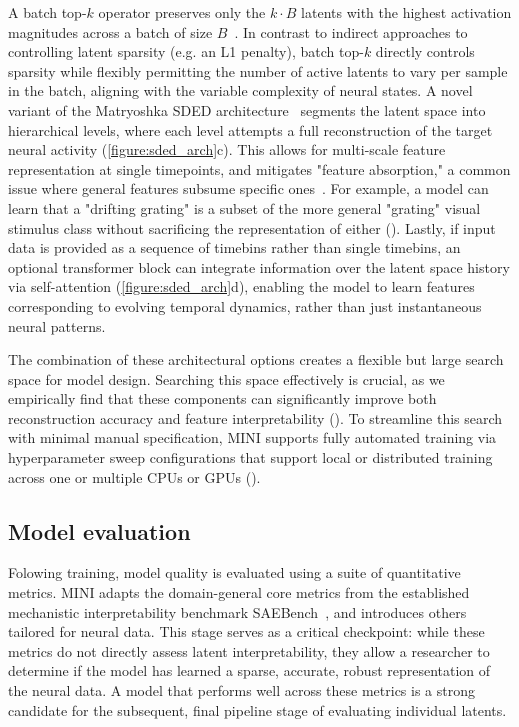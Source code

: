 A batch top-$k$ operator preserves only the $k \cdot B$ latents with the highest activation magnitudes across a batch of size $B$~\cite{bussmann_2024_batchtopk}. In contrast to indirect approaches to controlling latent sparsity (e.g. an L1 penalty), batch top-$k$ directly controls sparsity while flexibly permitting the number of active latents to vary per sample in the batch, aligning with the variable complexity of neural states. A novel variant of the Matryoshka SDED architecture~\cite{bussmann_2025_msae} segments the latent space into hierarchical levels, where each level attempts a full reconstruction of the target neural activity (\autoref{figure:sded_arch}c). This allows for multi-scale feature representation at single timepoints, and mitigates "feature absorption," a common issue where general features subsume specific ones~\cite{chanin_2024_feature_absorption}. For example, a model can learn that a "drifting grating" is a subset of the more general "grating" visual stimulus class without sacrificing the representation of either (). Lastly, if input data is provided as a sequence of timebins rather than single timebins, an optional transformer block can integrate information over the latent space history via self-attention (\autoref{figure:sded_arch}d), enabling the model to learn features corresponding to evolving temporal dynamics, rather than just instantaneous neural patterns. 

The combination of these architectural options creates a flexible but large search space for model design. Searching this space effectively is crucial, as we empirically find that these components can significantly improve both reconstruction accuracy and feature interpretability (). To streamline this search with minimal manual specification, MINI supports fully automated training via hyperparameter sweep configurations that support local or distributed training across one or multiple CPUs or GPUs ().

\subsection{Model evaluation}

Folowing training, model quality is evaluated using a suite of quantitative metrics. MINI adapts the domain-general core metrics from the established mechanistic interpretability benchmark SAEBench~\cite{karvonen_2025_saebench}, and introduces others tailored for neural data. This stage serves as a critical checkpoint: while these metrics do not directly assess latent interpretability, they allow a researcher to determine if the model has learned a sparse, accurate, robust representation of the neural data. A model that performs well across these metrics is a strong candidate for the subsequent, final pipeline stage of evaluating individual latents.

